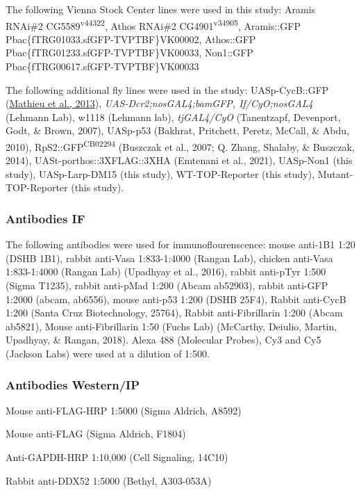 \documentclass[12pt,oneside]{reedthesis}
\begin{document}
The following Vienna Stock Center lines were used in this study: Aramis RNAi\#2 CG5589\textsuperscript{v44322}, Athos RNAi\#2 CG4901\textsuperscript{v34905}, Aramis::GFP Pbac\{fTRG01033.sfGFP-TVPTBF\}VK00002, Athos::GFP Pbac\{fTRG01233.sfGFP-TVPTBF\}VK00033, Non1::GFP Pbac\{fTRG00617.sfGFP-TVPTBF\}VK00033

The following additional fly lines were used in the study: UASp-CycB::GFP (\href{https://www.ncbi.nlm.nih.gov/pmc/articles/PMC5830152/\#R25}{Mathieu et al., 2013}), \emph{UAS-Dcr2;nosGAL4;bamGFP, If/CyO;nosGAL4} (Lehmann Lab), w1118 (Lehmann lab), \emph{tjGAL4/CyO} (Tanentzapf, Devenport, Godt, \& Brown, 2007), UASp-p53 (Bakhrat, Pritchett, Peretz, McCall, \& Abdu, 2010), RpS2::GFP\textsuperscript{CB02294} (Buszczak et al., 2007; Q. Zhang, Shalaby, \& Buszczak, 2014), UASt-porthos::3XFLAG::3XHA (Emtenani et al., 2021), UASp-Non1 (this study), UASp-Larp-DM15 (this study), WT-TOP-Reporter (this study), Mutant-TOP-Reporter (this study).

\hypertarget{antibodies-if}{%
\subsubsection{Antibodies IF}\label{antibodies-if}}

The following antibodies were used for immunoflourenscence: mouse anti-1B1 1:20 (DSHB 1B1), rabbit anti-Vasa 1:833-1:4000 (Rangan Lab), chicken anti-Vasa 1:833-1:4000 (Rangan Lab) (Upadhyay et al., 2016), rabbit anti-pTyr 1:500 (Sigma T1235), rabbit anti-pMad 1:200 (Abcam ab52903), rabbit anti-GFP 1:2000 (abcam, ab6556), mouse anti-p53 1:200 (DSHB 25F4), Rabbit anti-CycB 1:200 (Santa Cruz Biotechnology, 25764), Rabbit anti-Fibrillarin 1:200 (Abcam ab5821), Mouse anti-Fibrillarin 1:50 (Fuchs Lab) (McCarthy, Deiulio, Martin, Upadhyay, \& Rangan, 2018). Alexa 488 (Molecular Probes), Cy3 and Cy5 (Jackson Labs) were used at a dilution of 1:500.

\hypertarget{antibodies-westernip}{%
\subsubsection{Antibodies Western/IP}\label{antibodies-westernip}}

Mouse anti-FLAG-HRP 1:5000 (Sigma Aldrich, A8592)

Mouse anti-FLAG (Sigma Aldrich, F1804)

Anti-GAPDH-HRP 1:10,000 (Cell Signaling, 14C10)

Rabbit anti-DDX52 1:5000 (Bethyl, A303-053A)
\end{document}
